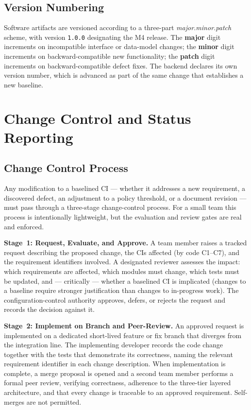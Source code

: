 \subsection{Version Numbering}

Software artifacts are versioned according to a three-part
\emph{major.minor.patch} scheme, with version \texttt{1.0.0} designating the M4
release. The \textbf{major} digit increments on incompatible interface or data-model
changes; the \textbf{minor} digit increments on backward-compatible new
functionality; the \textbf{patch} digit increments on backward-compatible defect
fixes. The backend declares its own version number, which is advanced as part of the
same change that establishes a new baseline.

\section{Change Control and Status Reporting}
\label{sec:scm-change}

\subsection{Change Control Process}

Any modification to a baselined CI --- whether it addresses a new requirement, a
discovered defect, an adjustment to a policy threshold, or a document revision ---
must pass through a three-stage change-control process. For a small team this
process is intentionally lightweight, but the evaluation and review gates are real
and enforced.

\textbf{Stage~1: Request, Evaluate, and Approve.}
A team member raises a tracked request describing the proposed change, the CIs
affected (by code C1--C7), and the requirement identifiers involved. A designated
reviewer assesses the impact: which requirements are affected, which modules must
change, which tests must be updated, and --- critically --- whether a baselined CI
is implicated (changes to a baseline require stronger justification than changes to
in-progress work). The configuration-control authority approves, defers, or rejects
the request and records the decision against it.

\textbf{Stage~2: Implement on Branch and Peer-Review.}
An approved request is implemented on a dedicated short-lived feature or fix branch
that diverges from the integration line. The implementing developer records the code
change together with the tests that demonstrate its correctness, naming the relevant
requirement identifier in each change description. When implementation is complete, a
merge proposal is opened and a second team member performs a formal peer review,
verifying correctness, adherence to the three-tier layered architecture, and that
every change is traceable to an approved requirement. Self-merges are not permitted.

